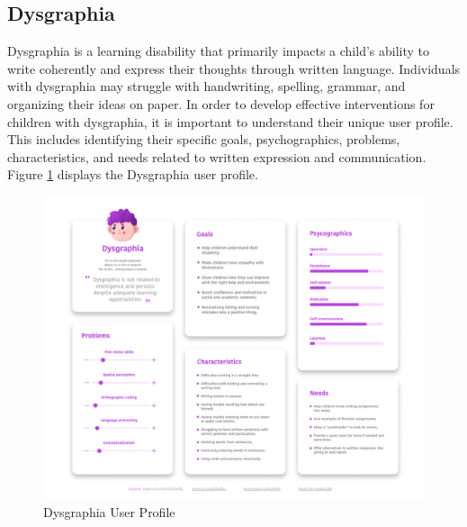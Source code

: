 \subsection{Dysgraphia}
Dysgraphia is a learning disability that primarily impacts a child's ability to write coherently and express their thoughts through written language. Individuals with dysgraphia may struggle with handwriting, spelling, grammar, and organizing their ideas on paper. In order to develop effective interventions for children with dysgraphia, it is important to understand their unique user profile. This includes identifying their specific goals, psychographics, problems, characteristics, and needs related to written expression and communication. Figure \ref{fig:disgrafiaUserProfile} displays the Dysgraphia user profile.

\begin{figure}[H]
    \centering
    \includegraphics[width=1\linewidth]{Chapters/figma/Disgrafia.png}
    \caption{Dysgraphia User Profile}
    \label{fig:disgrafiaUserProfile}
\end{figure}

